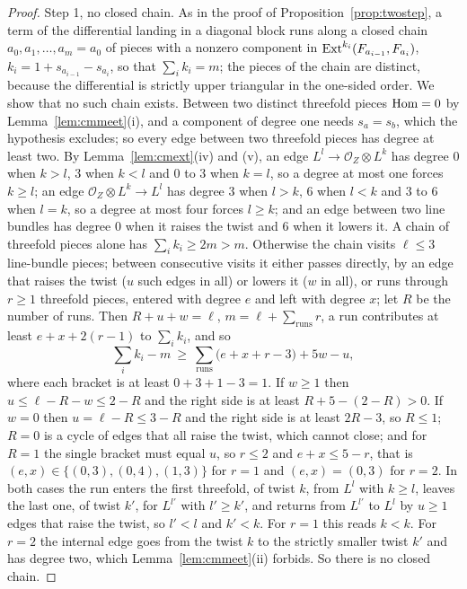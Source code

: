 \begin{proof}
Step 1, no closed chain. As in the proof of Proposition~\ref{prop:twostep}, a term of the differential landing in a diagonal block runs along a closed chain $a_{0},a_{1},\dots,a_{m}=a_{0}$ of pieces with a nonzero component in $\mathrm{Ext}^{k_{i}}(F_{a_{i-1}},F_{a_{i}})$, $k_{i}=1+s_{a_{i-1}}-s_{a_{i}}$, so that $\sum_{i}k_{i}=m$; the pieces of the chain are distinct, because the differential is strictly upper triangular in the one-sided order. We show that no such chain exists. Between two distinct threefold pieces $\mathrm{Hom}=0$ by Lemma~\ref{lem:cmmeet}(i), and a component of degree one needs $s_{a}=s_{b}$, which the hypothesis excludes; so every edge between two threefold pieces has degree at least two. By Lemma~\ref{lem:cmext}(iv) and (v), an edge $L^{l}\to\mathcal{O}_{Z}\otimes L^{k}$ has degree $0$ when $k>l$, $3$ when $k<l$ and $0$ to $3$ when $k=l$, so a degree at most one forces $k\ge l$; an edge $\mathcal{O}_{Z}\otimes L^{k}\to L^{l}$ has degree $3$ when $l>k$, $6$ when $l<k$ and $3$ to $6$ when $l=k$, so a degree at most four forces $l\ge k$; and an edge between two line bundles has degree $0$ when it raises the twist and $6$ when it lowers it. A chain of threefold pieces alone has $\sum_{i}k_{i}\ge2m>m$. Otherwise the chain visits $\ell\le3$ line-bundle pieces; between consecutive visits it either passes directly, by an edge that raises the twist ($u$ such edges in all) or lowers it ($w$ in all), or runs through $r\ge1$ threefold pieces, entered with degree $e$ and left with degree $x$; let $R$ be the number of runs. Then $R+u+w=\ell$, $m=\ell+\sum_{\mathrm{runs}}r$, a run contributes at least $e+x+2(r-1)$ to $\sum_{i}k_{i}$, and so
\[
\sum_{i}k_{i}-m\ \ge\ \sum_{\mathrm{runs}}\bigl(e+x+r-3\bigr)+5w-u ,
\]
where each bracket is at least $0+3+1-3=1$. If $w\ge1$ then $u\le\ell-R-w\le2-R$ and the right side is at least $R+5-(2-R)>0$. If $w=0$ then $u=\ell-R\le3-R$ and the right side is at least $2R-3$, so $R\le1$; $R=0$ is a cycle of edges that all raise the twist, which cannot close; and for $R=1$ the single bracket must equal $u$, so $r\le2$ and $e+x\le5-r$, that is $(e,x)\in\{(0,3),(0,4),(1,3)\}$ for $r=1$ and $(e,x)=(0,3)$ for $r=2$. In both cases the run enters the first threefold, of twist $k$, from $L^{l}$ with $k\ge l$, leaves the last one, of twist $k'$, for $L^{l'}$ with $l'\ge k'$, and returns from $L^{l'}$ to $L^{l}$ by $u\ge1$ edges that raise the twist, so $l'<l$ and $k'<k$. For $r=1$ this reads $k<k$. For $r=2$ the internal edge goes from the twist $k$ to the strictly smaller twist $k'$ and has degree two, which Lemma~\ref{lem:cmmeet}(ii) forbids. So there is no closed chain.


\end{proof}
